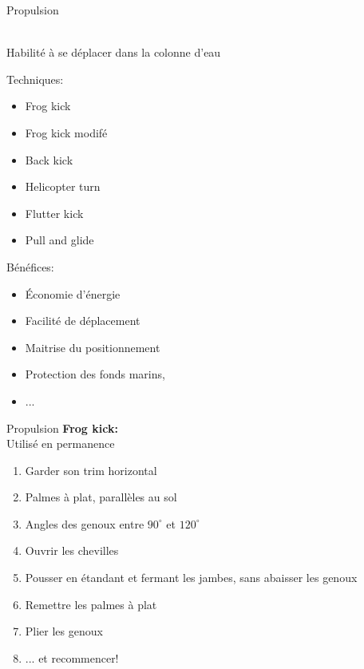 \begin{frame}{Propulsion}
	\begin{center}
		\resizebox{!}{18pt}{\strut\textbf{\insertsubsection}\strut}\\
		Habilité à se déplacer dans la colonne d'eau
	\end{center}
	\vfill
	\begin{multicols}{2}
		Techniques:
		\begin{itemize}
			\item Frog kick
			\item Frog kick modifé
			\item Back kick
			\item Helicopter turn
			\item Flutter kick
			\item Pull and glide
		\end{itemize}

		\columnbreak

		Bénéfices:
		\begin{itemize}
			\item Économie d'énergie
			\item Facilité de déplacement
			\item Maitrise du positionnement
			\item Protection des fonds marins,
			\item ...
		\end{itemize}
	\end{multicols}
\end{frame}

\begin{frame}{Propulsion}  
	\textbf{Frog kick:}\\
	Utilisé en permanence
	
	\begin{enumerate}
		\item Garder son trim horizontal
		\item Palmes à plat, parallèles au sol
		\item Angles des genoux entre $90^{\circ}$ et $120^{\circ}$
		\item Ouvrir les chevilles
		\item Pousser en étandant et fermant les jambes, sans abaisser les genoux
		\item Remettre les palmes à plat
		\item Plier les genoux
		\item ... et recommencer! 
	\end{enumerate}
\end{frame}

